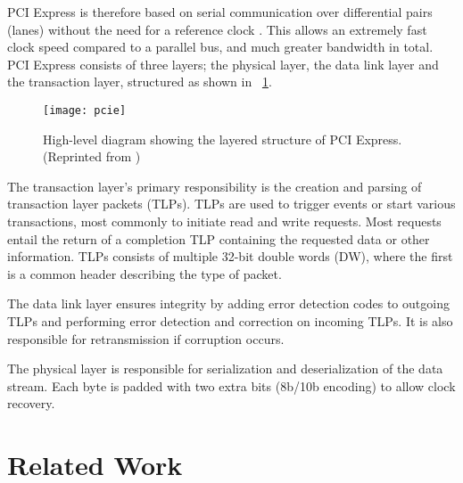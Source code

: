 PCI Express is therefore based on serial communication over differential pairs (lanes\footnotemark) without the need for a reference clock \cite{pcie}.
This allows an extremely fast clock speed compared to a parallel bus, and much greater bandwidth in total.
PCI Express consists of three layers; the physical layer, the data link layer and the transaction layer, structured as shown in \figurename~\ref{fig:pcie}.

\begin{figure}[!ht]
    \centering
    \texttt{[image: pcie]}
    \caption[PCI Express structure]{
        High-level diagram showing the layered structure of PCI Express. (Reprinted from \cite{pcie})
    }
    \label{fig:pcie}
\end{figure}

The transaction layer's primary responsibility is the creation and parsing of transaction layer packets (TLPs).
TLPs are used to trigger events or start various transactions, most commonly to initiate read and write requests\footnotemark.
Most requests entail the return of a completion TLP containing the requested data or other information.
TLPs consists of multiple 32-bit double words (DW), where the first is a common header describing the type of packet.

The data link layer ensures integrity by adding error detection codes to outgoing TLPs and performing error detection and correction on incoming TLPs.
It is also responsible for retransmission if corruption occurs.

The physical layer is responsible for serialization and deserialization of the data stream.
Each byte is padded with two extra bits (8b/10b encoding) to allow clock recovery.


\section{Related Work}

